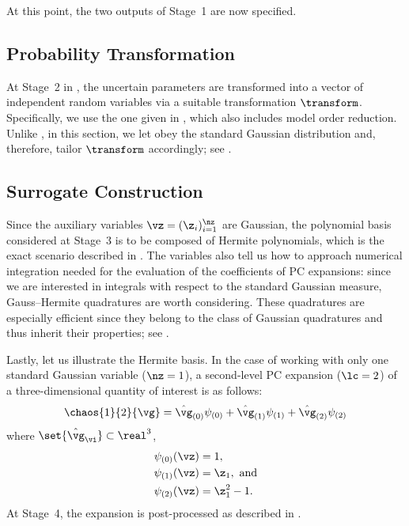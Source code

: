 At this point, the two outputs of Stage~1 are now specified.

\subsection{Probability Transformation}

At Stage~2 in , the uncertain parameters \vu are
transformed into a vector of independent random variables \vz via a suitable
transformation $\transform$. Specifically, we use the one given in
, which also includes model order reduction.
Unlike , in this section, we let \vz obey the
standard Gaussian distribution and, therefore, tailor $\transform$ accordingly;
see .

\subsection{Surrogate Construction}

Since the auxiliary variables $\vz = (\z_i)_{i = 1}^\nz$ are Gaussian, the
polynomial basis considered at Stage~3 is to be composed of Hermite polynomials,
which is the exact scenario described in . The variables
also tell us how to approach numerical integration needed for the evaluation of
the coefficients of \ac{PC} expansions: since we are interested in integrals
with respect to the standard Gaussian measure, Gauss--Hermite quadratures
\cite{maitre2010} are worth considering. These quadratures are especially
efficient since they belong to the class of Gaussian quadratures and thus
inherit their properties; see .

Lastly, let us illustrate the Hermite basis. In the case of working with only
one standard Gaussian variable ($\nz = 1$), a second-level \ac{PC} expansion
($\lc = 2$) of a three-dimensional quantity of interest \vg is as follows:
\[
  \chaos{1}{2}{\vg}
  = \hat{\vg}_{(0)} \psi_{(0)}
  + \hat{\vg}_{(1)} \psi_{(1)}
  + \hat{\vg}_{(2)} \psi_{(2)}
\]
where $\set{\hat{\vg}_{\vi}} \subset \real^3$,
\begin{align*}
  & \psi_{(0)}(\vz) = 1, \\
  & \psi_{(1)}(\vz) = \z_1, \text{ and} \\
  & \psi_{(2)}(\vz) = \z_1^2 - 1.
\end{align*}
At Stage~4, the expansion is post-processed as described in
.
